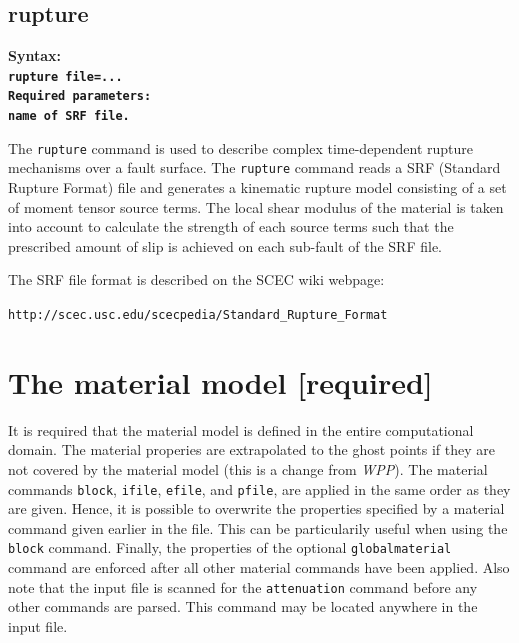 \documentclass[11pt]{report}
\begin{document}
\subsection{rupture}
\label{keyword:rupture}
\begin{flushleft}
\bf
Syntax:\\ \tt rupture file=...\\ 
\bf
Required parameters:\\ \rm name of SRF file.
\end{flushleft}
The \verb+rupture+ command is used to describe complex time-dependent rupture mechanisms over a
fault surface. The \verb+rupture+ command reads a SRF (Standard Rupture Format) file and generates a
kinematic rupture model consisting of a set of moment tensor source terms. The local shear modulus
of the material is taken into account to calculate the strength of each source terms such that the
prescribed amount of slip is achieved on each sub-fault of the SRF file. 

The SRF file format is described on the SCEC wiki webpage:

\verb+http://scec.usc.edu/scecpedia/Standard_Rupture_Format+

\section{The material model [required]} 

It is required that the material model is defined in the entire computational domain. The material
properies are extrapolated to the ghost points if they are not covered by the material model (this
is a change from \emph{WPP}). The material commands \verb+block+, \verb+ifile+, \verb+efile+, and
\verb+pfile+, are applied in the same order as they are given. Hence, it is possible to overwrite
the properties specified by a material command given earlier in the file. This can be particularily
useful when using the \verb+block+ command. Finally, the properties of the optional
\verb+globalmaterial+ command are enforced after all other material commands have been applied. Also
note that the input file is scanned for the \verb+attenuation+ command before any other commands are
parsed. This command may be located anywhere in the input file.
\end{document}
